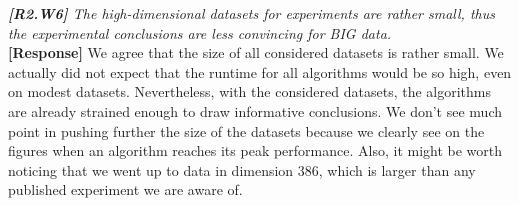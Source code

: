 \documentclass[11pt]{letter}
\newcommand{\svs}{\vspace{0.36ex}}
\newcommand{\TODO}[1]{\textcolor{red}{\textbf{[TODO:#1]}}}
\begin{document}


\svs
\noindent
{\em
{\bf [R2.W6]}
The high-dimensional datasets for experiments are rather small, thus the
experimental conclusions are less convincing for BIG data.}\\
\textbf{[Response]} We agree that the size of all considered datasets is rather small. We actually did not expect that 
the runtime for all algorithms would be so high, even on modest datasets. Nevertheless, with the considered datasets, 
the algorithms are already strained enough to draw 
informative conclusions. We don't see much point in pushing further the size of the datasets because we clearly see on 
the figures when an algorithm reaches its peak performance. Also, it might be worth noticing that we went up to data in 
dimension 386, which is larger than any published experiment we are aware of.


%


\end{document}
